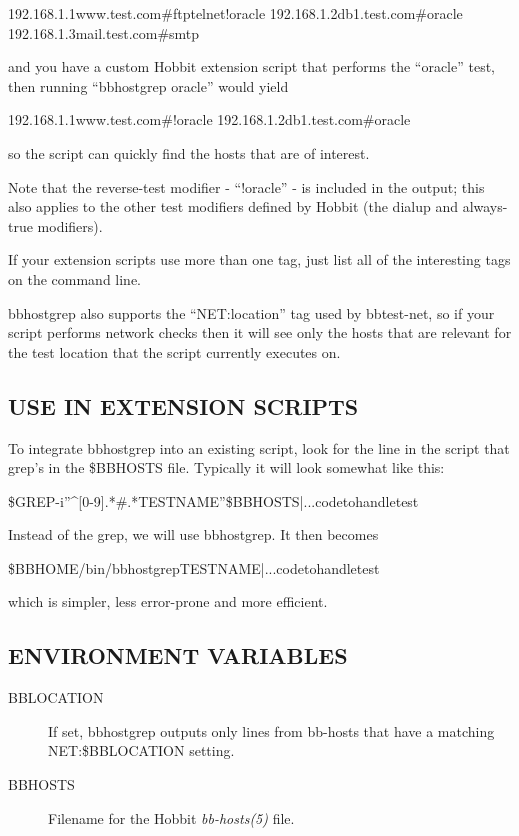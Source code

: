   
192.168.1.1www.test.com\#ftptelnet!oracle  
192.168.1.2db1.test.com\#oracle  
192.168.1.3mail.test.com\#smtp 


  and you have a custom Hobbit extension script that performs the
  ``oracle'' test, then running ``bbhostgrep oracle'' would yield 



  
192.168.1.1www.test.com\#!oracle  
192.168.1.2db1.test.com\#oracle 


  so the script can quickly find the hosts that are of interest. 


  Note that the reverse-test modifier - ``!oracle'' - is included in
  the output; this also applies to the other test modifiers defined by
  Hobbit (the dialup and always-true modifiers). 



  If your extension scripts use more than one tag, just list all of
  the interesting tags on the command line. 



  bbhostgrep also supports the ``NET:location'' tag used by
  bbtest-net, so if your script performs network checks then it will
  see only the hosts that are relevant for the test location that the
  script currently executes on. 



 
\subsection{USE IN EXTENSION SCRIPTS}
 To integrate bbhostgrep into an existing script, look for the line in the script that grep's in the \$BBHOSTS file. Typically it will look somewhat like this: 

  
\$GREP-i''\^{}[0-9].*\#.*TESTNAME''\$BBHOSTS|...codetohandletest 


  Instead of the grep, we will use bbhostgrep. It then becomes 


  
\$BBHOME/bin/bbhostgrepTESTNAME|...codetohandletest 


  which is simpler, less error-prone and more efficient. 


 
\subsection{ENVIRONMENT VARIABLES}
\begin{description}
\item[BBLOCATION] If set, bbhostgrep outputs only lines from bb-hosts that have a matching NET:\$BBLOCATION setting. 

 

\item[BBHOSTS] Filename for the Hobbit \emph{bb-hosts(5)}
 file. 

 


\end{description}
